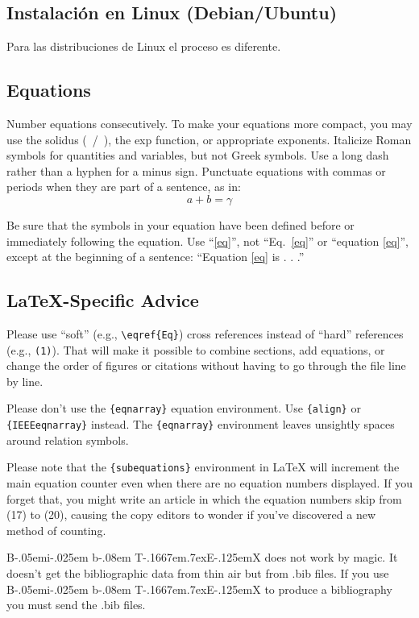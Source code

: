 \documentclass[conference]{IEEEtran}
\def\BibTeX{{\rm B\kern-.05em{\sc i\kern-.025em b}\kern-.08em
    T\kern-.1667em\lower.7ex\hbox{E}\kern-.125emX}}
\begin{document}
\subsection{Instalación en Linux (Debian/Ubuntu)}

Para las distribuciones de Linux el proceso es diferente. 

\subsection{Equations}
Number equations consecutively. To make your 
equations more compact, you may use the solidus (~/~), the exp function, or 
appropriate exponents. Italicize Roman symbols for quantities and variables, 
but not Greek symbols. Use a long dash rather than a hyphen for a minus 
sign. Punctuate equations with commas or periods when they are part of a 
sentence, as in:
\begin{equation}
a+b=\gamma\label{eq}
\end{equation}

Be sure that the 
symbols in your equation have been defined before or immediately following 
the equation. Use ``\eqref{eq}'', not ``Eq.~\eqref{eq}'' or ``equation \eqref{eq}'', except at 
the beginning of a sentence: ``Equation \eqref{eq} is . . .''

\subsection{\LaTeX-Specific Advice}

Please use ``soft'' (e.g., \verb|\eqref{Eq}|) cross references instead
of ``hard'' references (e.g., \verb|(1)|). That will make it possible
to combine sections, add equations, or change the order of figures or
citations without having to go through the file line by line.

Please don't use the \verb|{eqnarray}| equation environment. Use
\verb|{align}| or \verb|{IEEEeqnarray}| instead. The \verb|{eqnarray}|
environment leaves unsightly spaces around relation symbols.

Please note that the \verb|{subequations}| environment in {\LaTeX}
will increment the main equation counter even when there are no
equation numbers displayed. If you forget that, you might write an
article in which the equation numbers skip from (17) to (20), causing
the copy editors to wonder if you've discovered a new method of
counting.

{\BibTeX} does not work by magic. It doesn't get the bibliographic
data from thin air but from .bib files. If you use {\BibTeX} to produce a
bibliography you must send the .bib files. 
\end{document}
